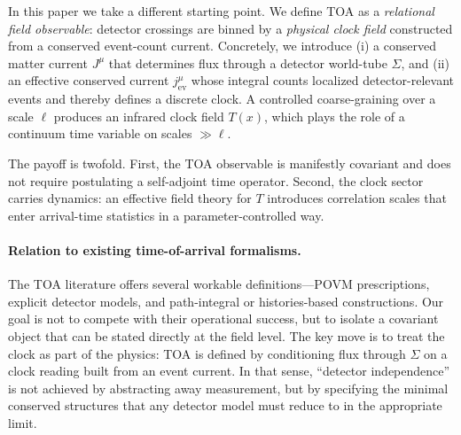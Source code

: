 \documentclass[pdflatex,sn-mathphys-num]{sn-jnl}
\theoremstyle{thmstylethree}
\theoremstyle{thmstyleone}
\theoremstyle{thmstyletwo}
\numberwithin{equation}{section}
\begin{document}
        In this paper we take a different starting point. We define TOA as a \emph{relational field observable}: detector crossings are binned by a \emph{physical clock field} constructed from a conserved event-count current. Concretely, we introduce (i) a conserved matter current $J^\mu$ that determines flux through a detector world-tube $\Sigma$, and (ii) an effective conserved current $j^\mu_{\mathrm{ev}}$ whose integral counts localized detector-relevant events and thereby defines a discrete clock. A controlled coarse-graining over a scale $\ell$ produces an infrared clock field $T(x)$, which plays the role of a continuum time variable on scales $\gg \ell$.
        
        The payoff is twofold. First, the TOA observable is manifestly covariant and does not require postulating a self-adjoint time operator. Second, the clock sector carries dynamics: an effective field theory for $T$ introduces correlation scales that enter arrival-time statistics in a parameter-controlled way.
        
        \paragraph{Relation to existing time-of-arrival formalisms.}
            The TOA literature offers several workable definitions---POVM prescriptions, explicit detector models, and path-integral or histories-based constructions. Our goal is not to compete with their operational success, but to isolate a covariant object that can be stated directly at the field level. The key move is to treat the clock as part of the physics: TOA is defined by conditioning flux through $\Sigma$ on a clock reading built from an event current. In that sense, ``detector independence'' is not achieved by abstracting away measurement, but by specifying the minimal conserved structures that any detector model must reduce to in the appropriate limit.
        
\end{document}
